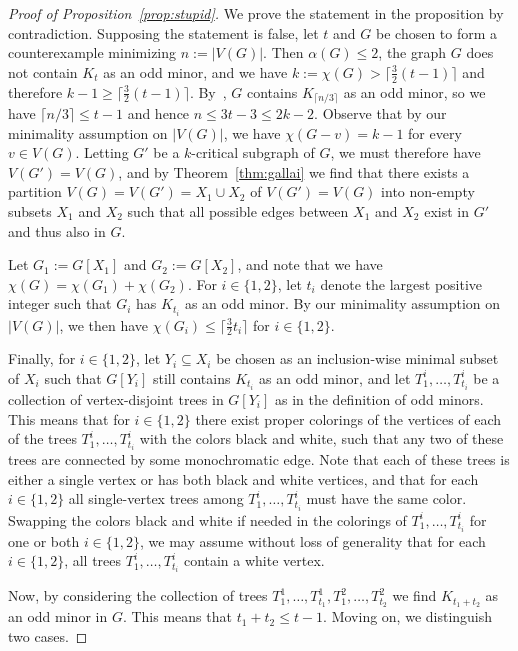 \documentclass[11pt,reqno,oneside]{amsart}
\theoremstyle{definition}
\newcommand\1{\mathbf{1}}
\let\leq\leqslant
\let\geq\geqslant
\begin{document}
\begin{proof}[Proof of Proposition~\ref{prop:stupid}]
We prove the statement in the proposition by contradiction. Supposing the  statement is false, let $t$ and $G$ be chosen to form a counterexample minimizing $n:=|V(G)|$. Then $\alpha(G)\leq 2$, the graph $G$ does not contain $K_t$ as an odd minor, and we have $k:=\chi(G)>\lceil\frac{3}{2}(t-1)\rceil$ and therefore $k-1\geq \lceil\frac{3}{2}(t-1)\rceil$. By~\cite[Theorem~1.8]{kawasong}, $G$ contains $K_{\lceil n/3\rceil}$ as an odd minor, so we have $\lceil n/3\rceil\leq t-1$ and hence $n\leq 3t-3\leq 2k-2$. Observe that by our minimality assumption on $|V(G)|$, we have $\chi(G-v)=k-1$ for every $v\in V(G)$. Letting $G'$ be a $k$-critical subgraph of $G$, we must therefore have $V(G')=V(G)$, and by Theorem~\ref{thm:gallai} we find that there exists a partition $V(G)=V(G')=X_1\cup X_2$ of $V(G')=V(G)$ into non-empty subsets $X_1$ and $X_2$ such that all possible edges between $X_1$ and $X_2$ exist in $G'$ and thus also in $G$. 

Let $G_1:=G[X_1]$ and $G_2:=G[X_2]$, and note that we have $\chi(G)=\chi(G_1)+\chi(G_2)$. For $i\in \{1,2\}$, let $t_i$ denote the largest positive integer such that $G_i$ has $K_{t_i}$ as an odd minor. By our minimality assumption on $|V(G)|$, we then have $\chi(G_i)\leq \lceil\frac{3}{2}t_i \rceil$ for $i\in \{1,2\}$.

Finally, for $i\in \{1,2\}$, let $Y_i\subseteq X_i$ be chosen as an inclusion-wise minimal subset of $X_i$ such that $G[Y_i]$ still contains $K_{t_i}$ as an odd minor, and let $T_1^i,\ldots,T_{t_i}^i$ be a collection of vertex-disjoint trees in $G[Y_i]$ as in the definition of odd minors. This means that for $i\in \{1,2\}$ there exist proper colorings of the vertices of each of the trees $T_{1}^i,\ldots,T_{t_i}^i$ with the colors black and white, such that any two of these trees are connected by some monochromatic edge. Note that each of these trees  is either a single vertex or has both black and white vertices, and that for each $i\in \{1,2\}$ all single-vertex trees among $T_1^i,\ldots,T_{t_i}^i$ must have the same color. Swapping the colors black and white if needed in the colorings of $T_{1}^i,\ldots,T_{t_i}^i$ for one or both $i\in \{1,2\}$, we may assume without loss of generality that for each $i\in \{1,2\}$, all trees $T_1^i,\ldots,T_{t_i}^i$ contain a white vertex.

Now, by considering the collection of trees $T_1^1,\ldots,T_{t_1}^1, T_1^2,\ldots,T_{t_2}^2$ we find $K_{t_1+t_2}$ as an odd minor in $G$. This means that $t_1+t_2\leq t-1$. Moving on, we distinguish two cases.


\end{proof}
\end{document}
